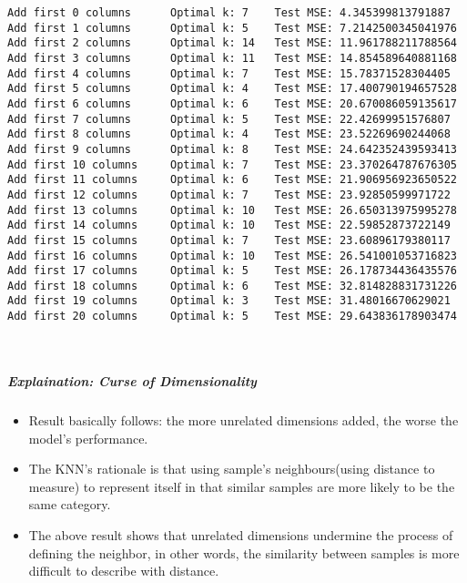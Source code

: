 \documentclass[11pt]{article}
\providecommand{\tightlist}{%
      \setlength{\itemsep}{0pt}\setlength{\parskip}{0pt}}
\begin{document}
    \begin{Verbatim}[commandchars=\\\{\}]
Add first 0 columns      Optimal k: 7    Test MSE: 4.345399813791887
Add first 1 columns      Optimal k: 5    Test MSE: 7.2142500345041976
Add first 2 columns      Optimal k: 14   Test MSE: 11.961788211788564
Add first 3 columns      Optimal k: 11   Test MSE: 14.854589640881168
Add first 4 columns      Optimal k: 7    Test MSE: 15.78371528304405
Add first 5 columns      Optimal k: 4    Test MSE: 17.400790194657528
Add first 6 columns      Optimal k: 6    Test MSE: 20.670086059135617
Add first 7 columns      Optimal k: 5    Test MSE: 22.42699951576807
Add first 8 columns      Optimal k: 4    Test MSE: 23.52269690244068
Add first 9 columns      Optimal k: 8    Test MSE: 24.642352439593413
Add first 10 columns     Optimal k: 7    Test MSE: 23.370264787676305
Add first 11 columns     Optimal k: 6    Test MSE: 21.906956923650522
Add first 12 columns     Optimal k: 7    Test MSE: 23.92850599971722
Add first 13 columns     Optimal k: 10   Test MSE: 26.650313975995278
Add first 14 columns     Optimal k: 10   Test MSE: 22.59852873722149
Add first 15 columns     Optimal k: 7    Test MSE: 23.60896179380117
Add first 16 columns     Optimal k: 10   Test MSE: 26.541001053716823
Add first 17 columns     Optimal k: 5    Test MSE: 26.178734436435576
Add first 18 columns     Optimal k: 6    Test MSE: 32.814828831731226
Add first 19 columns     Optimal k: 3    Test MSE: 31.48016670629021
Add first 20 columns     Optimal k: 5    Test MSE: 29.643836178903474
    \end{Verbatim}

    \begin{center}
    \end{center}
    { \hspace*{\fill} \\}
    
    \hypertarget{explaination-curse-of-dimensionality}{%
\subparagraph{Explaination: Curse of
Dimensionality}\label{explaination-curse-of-dimensionality}}

\begin{itemize}
\tightlist
\item
  Result basically follows: the more unrelated dimensions added, the
  worse the model's performance.
\item
  The KNN's rationale is that using sample's neighbours(using distance
  to measure) to represent itself in that similar samples are more
  likely to be the same category.
\item
  The above result shows that unrelated dimensions undermine the process
  of defining the neighbor, in other words, the similarity between
  samples is more difficult to describe with distance.
\end{itemize}


    
    
    
\end{document}

